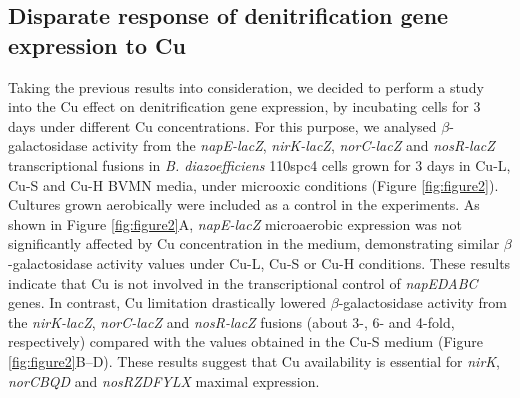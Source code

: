 \documentclass[a4paper,11pt]{article}
\begin{document}
\subsection{Disparate response of denitrification gene expression to Cu}
Taking the previous results into consideration, we decided to perform a study into the Cu
effect on denitrification gene expression, by incubating cells for 3 days under different Cu
concentrations. For this purpose, we analysed $\beta$-galactosidase activity from the {\em napE-lacZ},
{\em nirK-lacZ}, {\em norC-lacZ} and {\em nosR-lacZ} transcriptional fusions in {\em B. diazoefficiens} 110spc4 cells
grown for 3 days in Cu-L, Cu-S and Cu-H BVMN media, under microoxic conditions
(Figure \ref{fig:figure2}). Cultures grown aerobically were included as a control in the experiments. As
shown in Figure \ref{fig:figure2}A, {\em napE-lacZ} microaerobic expression was not significantly affected by
Cu concentration in the medium, demonstrating similar $\beta$-galactosidase activity values
under Cu-L, Cu-S or Cu-H conditions. These results indicate that Cu is not involved
in the transcriptional control of {\em napEDABC} genes. In contrast, Cu limitation drastically
lowered $\beta$-galactosidase activity from the {\em nirK-lacZ}, {\em norC-lacZ} and {\em nosR-lacZ} fusions (about
3-, 6- and 4-fold, respectively) compared with the values obtained in the Cu-S medium
(Figure \ref{fig:figure2}B–D). These results suggest that Cu availability is essential for {\em nirK}, {\em norCBQD}
and {\em nosRZDFYLX} maximal expression.
\end{document}
